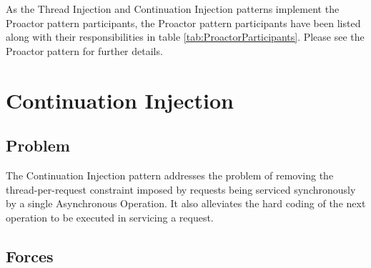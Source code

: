 \documentclass[prodmode]{style/acmlarge}
\begin{document}
As the Thread Injection and Continuation Injection patterns implement the
Proactor pattern participants, the Proactor pattern participants have been
listed along with their responsibilities in table
\ref{tab:ProactorParticipants}.  Please see the Proactor pattern \cite{proactor}
for further details.

\begin{table}[t]
\label{tab:ProactorParticipants}
\end{table}



\section{Continuation Injection}


\subsection{Problem}

The Continuation Injection pattern addresses the problem of removing the
thread-per-request constraint imposed by requests being serviced synchronously
by a single Asynchronous Operation.  It also alleviates the hard coding of the
next operation to be executed in servicing a request.


\subsection{Forces}
\end{document}
